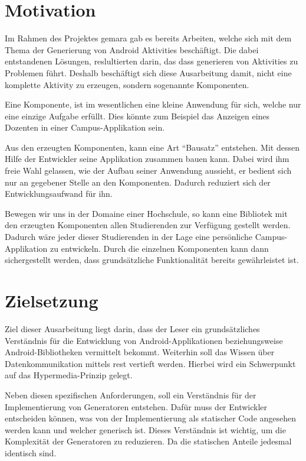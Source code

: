 \section{Motivation}\label{sec:motivation}
Im Rahmen des Projektes \ac{gemara} gab es bereits Arbeiten, welche sich mit dem Thema der Generierung von Android Aktivities beschäftigt. Die dabei entstandenen Lösungen, reslultierten darin, das dass generieren von Aktivities zu Problemen führt. Deshalb beschäftigt sich diese Ausarbeitung damit, nicht eine komplette Aktivity zu erzeugen, sondern sogenannte Komponenten.

Eine Komponente, ist im wesentlichen eine kleine Anwendung für sich, welche nur eine einzige Aufgabe erfüllt. Dies könnte zum Beispiel das Anzeigen eines Dozenten in einer Campus-Applikation sein.

Aus den erzeugten Komponenten, kann eine Art \enquote{Bausatz} entstehen. Mit dessen Hilfe der Entwickler seine Applikation zusammen bauen kann. Dabei wird ihm freie Wahl gelassen, wie der Aufbau seiner Anwendung aussieht, er bedient sich nur an gegebener Stelle an den Komponenten. Dadurch reduziert sich der Entwicklungsaufwand für ihn.

Bewegen wir uns in der Domaine einer Hochschule, so kann eine Bibliotek mit den erzeugten Komponenten allen Studierenden zur Verfügung gestellt werden. Dadurch wäre jeder dieser Studierenden in der Lage eine persönliche Campus-Applikation zu entwickeln. Durch die einzelnen Komponenten kann dann sichergestellt werden, dass grundsätzliche Funktionalität bereits gewährleistet ist.

\section{Zielsetzung}\label{sec:target}
Ziel dieser Ausarbeitung liegt darin, dass der Leser ein grundsätzliches Verständnis für die Entwicklung von Android-Applikationen beziehungsweise Android-Bibliotheken vermittelt bekommt. Weiterhin soll das Wissen über Datenkommunikation mittels \ac{rest} vertieft werden. Hierbei wird ein Schwerpunkt auf das Hypermedia-Prinzip gelegt. 

Neben diesen spezifischen Anforderungen, soll ein Verständnis für der Implementierung von Generatoren entstehen. Dafür muss der Entwickler entscheiden können, was von der Implementierung als statischer Code angesehen werden kann und welcher generisch ist. Dieses Verständnis ist wichtig, um die Komplexität der Generatoren zu reduzieren. Da die statischen Anteile jedesmal identisch sind.

